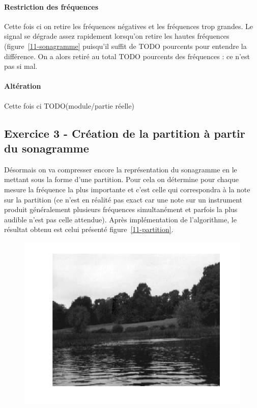 \documentclass{article}
\begin{document}
\paragraph{Restriction des fréquences}
Cette fois ci on retire les fréquences négatives et les fréquences trop grandes. Le signal se dégrade assez rapidement lorsqu'on retire les hautes fréquences (figure~\ref{11-sonagramme} puisqu'il suffit de TODO pourcents pour entendre la différence. On a alors retiré au total TODO pourcents des fréquences : ce n'est pas si mal.

\paragraph{Altération}
Cette fois ci TODO(module/partie réelle)

\subsection{Exercice 3 - Création de la partition à partir du sonagramme}
Désormais on va compresser encore la représentation du sonagramme en le mettant sous la forme d'une partition. Pour cela on détermine pour chaque mesure la fréquence la plus importante et c'est celle qui correspondra à la note sur la partition (ce n'est en réalité pas exact car une note sur un instrument produit généralement plusieurs fréquences simultanément et parfois la plus audible n'est pas celle attendue). Après implémentation de l'algorithme, le résultat obtenu est celui présenté figure~\ref{11-partition}.

\begin{figure}[!ht]
\includegraphics[width=\textwidth]{images/1/1-1-autumn_b.png}
\end{figure}
\end{document}
